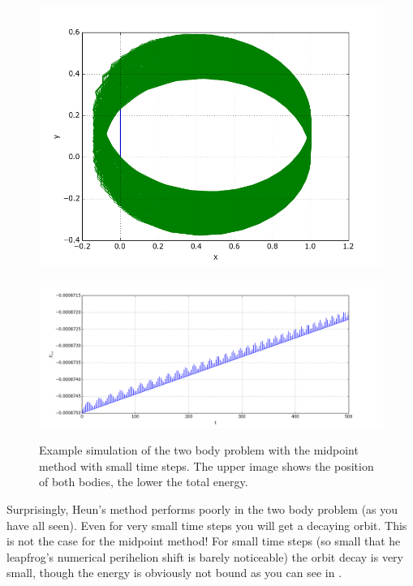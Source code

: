 \documentclass[a4paper,10pt,openany]{article}
\begin{document}
\begin{figure}
\begin{center}
\includegraphics[width=.7\textwidth]{midpoint_pos.png}\\
\end{center}
\begin{center}
\includegraphics[width=\textwidth]{midpoint_energy.png}\\
\end{center}
\caption{Example simulation of the two body problem with the midpoint method with small time steps. The upper image shows the position of both bodies, the lower the total energy.}\label{fig:midpoint performance}
\end{figure}

Surprisingly, Heun's method performs poorly in the two body problem (as you have all seen). Even for very small time steps you will get a decaying orbit. This is not the case for the midpoint method! For small time steps (so small that he leapfrog's numerical perihelion shift is barely noticeable) the orbit decay is very small, though the energy is obviously not bound as you can see in .


 
\end{document}
